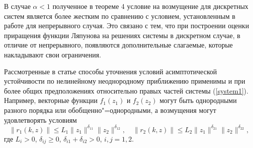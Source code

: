\begin{remark}[3]  В случае $\alpha<1$ полученное  в теореме 4
условие на возмущение для дискретных систем является более жестким
по сравнению с условием, установленным в работе \cite{sultan:bib14} для
непрерывного случая. Это связано с тем, что при построении оценки
приращения функции Ляпунова на решениях системы в дискретном случае, в отличие от непрерывного,
 появляются дополнительные слагаемые, которые накладывают свои ограничения.
\end{remark}

\begin{remark}[4] Рассмотренные в статье способы уточнения
условий асимптотической устойчивости по нелинейному неоднородному
приближению применимы и при более общих предположениях
относительно правых частей системы (\ref{system1}). Например,
векторные функции $f_1(z_1)$ и $f_2(z_2)$ могут быть однородными
разного порядка или обобщенно"=однородными, а возмущения могут
удовлетворять условиям $$\|r_1(k, z)\|\leq
L_1\|z_1\|^{\delta_{11}}\|z_2\|^{\delta_{12}},\quad  \|
r_2(k, z)\|\leq L_2\|z_1\|^{\delta_{21}}\|z_2\|^{\delta_{22}},$$
где $L_i>0$, $\delta_{ij}\geq 0$, $\delta_{i1}+\delta_{i2}>0$,
$i, j=1, 2$.
\end{remark}


